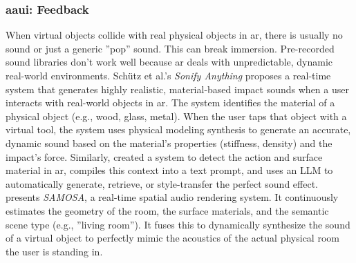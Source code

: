 \subsubsection{\gls{aaui}: Feedback}
When virtual objects collide with real physical objects in \gls{ar}, there is usually no sound or just a generic ''pop'' sound. This can break immersion. Pre-recorded sound libraries don't work well because \gls{ar} deals with unpredictable, dynamic real-world environments. Schütz et al.'s \cite{Schütz_25_SonifyAnything} \textit{Sonify Anything} proposes a real-time system that generates highly realistic, material-based impact sounds when a user interacts with real-world objects in \gls{ar}. The system identifies the material of a physical object (e.g., wood, glass, metal). When the user taps that object with a virtual tool, the system uses physical modeling synthesis to generate an accurate, dynamic sound based on the material's properties (stiffness, density) and the impact's force. Similarly, \citet{Su_24_SonifyAR} created a system to detect the action and surface material in \gls{ar}, compiles this context into a text prompt, and uses an LLM to automatically generate, retrieve, or style-transfer the perfect sound effect. \citet{Xu_25_RealistiRSoundBasedOnEnv} presents \textit{SAMOSA}, a real-time spatial audio rendering system. It continuously estimates the geometry of the room, the surface materials, and the semantic scene type (e.g., ''living room''). It fuses this to dynamically synthesize the sound of a virtual object to perfectly mimic the acoustics of the actual physical room the user is standing in.
\\


